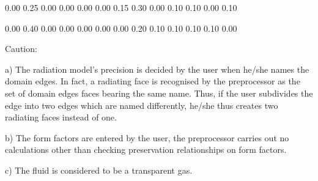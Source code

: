 0.00 0.25 0.00 0.00 0.00 0.00 0.15 0.30 0.00 0.10 0.10 0.00 0.10

0.00 0.40 0.00 0.00 0.00 0.00 0.00 0.20 0.10 0.10 0.10 0.10 0.00



Caution:

a) The radiation model's precision is decided by the user when he/she names the domain edges. In fact, a radiating face is recognised by the preprocessor as the set of domain edges faces bearing the same name. Thus, if the user subdivides the edge into two edges which are named differently, he/she thus creates two radiating faces instead of one.

b) The form factors are entered by the user, the preprocessor carries out no calculations other than checking preservation relationships on form factors.

c) The fluid is considered to be a transparent gas.
